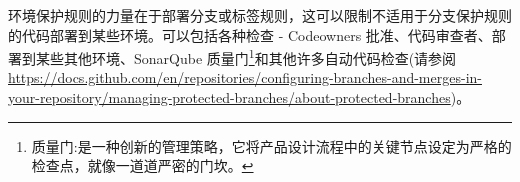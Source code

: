 环境保护规则的力量在于部署分支或标签规则，这可以限制不适用于分支保护规则的代码部署到某些环境。可以包括各种检查 - Codeowners 批准、代码审查者、部署到某些其他环境、SonarQube 质量门\footnote{质量门:是一种创新的管理策略，它将产品设计流程中的关键节点设定为严格的检查点，就像一道道严密的门坎。}和其他许多自动代码检查(请参阅\url{https://docs.github.com/en/repositories/configuring-branches-and-merges-in-your-repository/managing-protected-branches/about-protected-branches})。

























